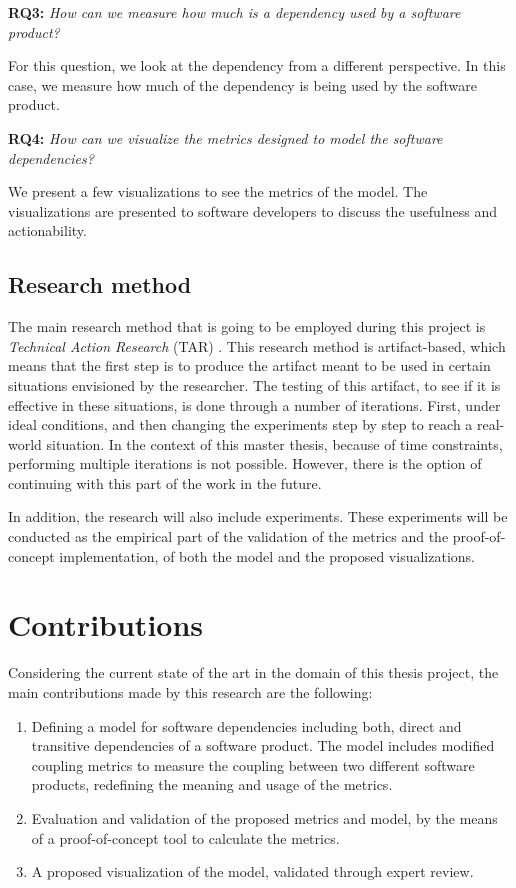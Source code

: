 \blankl
\textbf{RQ3:} \textit{How can we measure how much is a dependency used by a software product?}

\blankls
For this question, we look at the dependency from a different perspective. In this case, we measure how much of the dependency is being used by the software product.

\blankl
\textbf{RQ4:} \textit{How can we visualize the metrics designed to model the software dependencies?}

\blankls
We present a few visualizations to see the metrics of the model. The visualizations are presented to software developers to discuss the usefulness and actionability.

\subsection{Research method}
The main research method that is going to be employed during this project is \textit{Technical Action Research} (TAR) \cite{wieringa2012technical}.
This research method is artifact-based, which means that the first step is to produce the artifact meant to be used in certain situations envisioned by the researcher. The testing of this artifact, to see if it is effective in these situations, is done through a number of iterations. First, under ideal conditions, and then changing the experiments step by step to reach a real-world situation. In the context of this master thesis, because of time constraints, performing multiple iterations is not possible. However, there is the option of continuing with this part of the work in the future.

\blankl
In addition, the research will also include experiments. These experiments will be conducted as the empirical part of the validation of the metrics and the proof-of-concept implementation, of both the model and the proposed visualizations.

\section{Contributions}
Considering the current state of the art in the domain of this thesis project, the main contributions made by this research are the following:

\begin{enumerate}
	\item Defining a model for software dependencies including both, direct and transitive dependencies of a software product. The model includes modified coupling metrics to measure the coupling between two different software products, redefining the meaning and usage of the metrics.
  \blankls

	\item Evaluation and validation of the proposed metrics and model, by the means of a proof-of-concept tool to calculate the metrics.

  \item A proposed visualization of the model, validated through expert review.
\end{enumerate}

